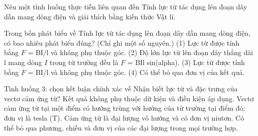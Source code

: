 \begin{bt}
Nêu một tình huống thực tiễn liên quan đến Tính lực từ tác dụng lên đoạn dây dẫn mang dòng điện và giải thích bằng kiến thức Vật lí.
\end{bt}

\begin{ex}
Trong bốn phát biểu về Tính lực từ tác dụng lên đoạn dây dẫn mang dòng điện, có bao nhiêu phát biểu đúng? (Chỉ ghi một số nguyên.) (1) Lực từ được tính bằng $F$ = BI/l và không phụ thuộc góc. (2) Độ lớn lực từ lên đoạn dây thẳng dài l mang dòng $I$ trong từ trường đều là $F$ = BIl sin(alpha). (3) Lực từ được tính bằng $F$ = BI/l và không phụ thuộc góc. (4) Có thể bỏ qua đơn vị của kết quả.
\end{ex}

\begin{ex}
Tình huống 3: chọn kết luận chính xác về Nhận biết lực từ và đặc trưng của vectơ cảm ứng từ?
\choice
{Kết quả không phụ thuộc dữ kiện và điều kiện áp dụng.}
{\True Vectơ cảm ứng từ tại một điểm có hướng trùng với hướng của từ trường tại điểm đó; đơn vị là tesla (T).}
{Cảm ứng từ là đại lượng vô hướng và có đơn vị niutơn.}
{Có thể bỏ qua phương, chiều và đơn vị của các đại lượng trong mọi trường hợp.}
\end{ex}

